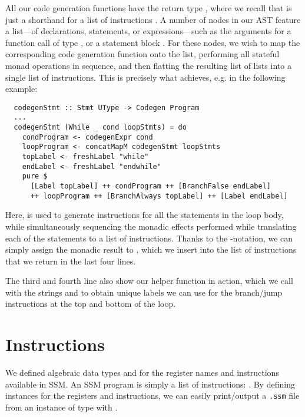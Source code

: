 All our code generation functions have the return type ,
where we recall that  is just a shorthand for a list of
instructions \haskell{[Instr]}.
A number of nodes in our AST feature a list---of declarations, statements,
or expressions---such as the arguments for a function call of type
, or a statement block .
For these nodes, we wish to map the corresponding code generation function onto
the list, performing all stateful monad operations in sequence, and then
flatting the resulting list of lists into a single list of instructions.
This is precisely what  achieves, e.g. in the following
example:
%
\begin{verbatim}
  codegenStmt :: Stmt UType -> Codegen Program
  ...
  codegenStmt (While _ cond loopStmts) = do
    condProgram <- codegenExpr cond
    loopProgram <- concatMapM codegenStmt loopStmts
    topLabel <- freshLabel "while"
    endLabel <- freshLabel "endwhile"
    pure $
      [Label topLabel] ++ condProgram ++ [BranchFalse endLabel]
      ++ loopProgram ++ [BranchAlways topLabel] ++ [Label endLabel]
\end{verbatim}

Here,  is used to generate instructions for
all the statements in the loop body, while simultaneously sequencing the monadic
effects performed while translating each of the statements to a list of
instructions. Thanks to the -notation, we can simply assign the
monadic result to , which we insert into the list of
instructions that we return in the last four lines.

The third and fourth line also show our  helper function in
action, which we call with the strings  and 
to obtain unique labels we can use for the branch/jump instructions at the
top and bottom of the  loop.



\section{Instructions}

We defined algebraic data types  and  for the
register names and instructions available in SSM. An SSM program is simply a
list of instructions: .
By defining  instances for the registers and instructions, we can
easily print/output a \verb|.ssm| file from an instance of type
\haskell{[Instr]} with .


